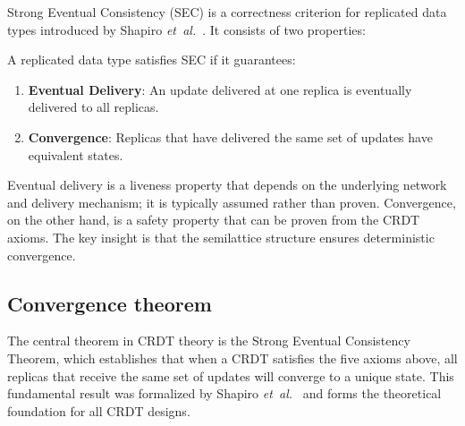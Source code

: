 Strong Eventual Consistency (SEC) is a correctness criterion for replicated data types introduced by Shapiro \emph{et~al.}~\cite{shapiro2011conflict}. It consists of two properties:

\begin{definition}
A replicated data type satisfies SEC if it guarantees:
\begin{enumerate}
  \item \textbf{Eventual Delivery}: An update delivered at one replica is eventually delivered to all replicas.
  \item \textbf{Convergence}: Replicas that have delivered the same set of updates have equivalent states.
\end{enumerate}
\end{definition}

Eventual delivery is a liveness property that depends on the underlying network and delivery mechanism; it is typically assumed rather than proven. Convergence, on the other hand, is a safety property that can be proven from the CRDT axioms. The key insight is that the semilattice structure ensures deterministic convergence.

\subsection*{Convergence theorem}

The central theorem in CRDT theory is the Strong Eventual Consistency Theorem, which establishes that when a CRDT satisfies the five axioms above, all replicas that receive the same set of updates  will converge to a unique state. This fundamental result was formalized by Shapiro \emph{et~al.}~\cite{shapiro2011conflict} and forms the theoretical foundation for all CRDT designs.

